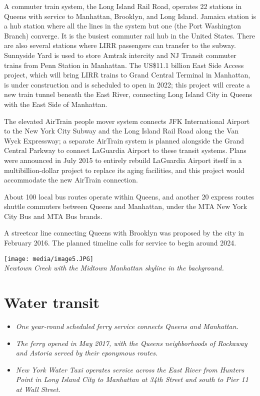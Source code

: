 A commuter train system, the Long Island Rail Road, operates 22 stations
in Queens with service to Manhattan, Brooklyn, and Long Island. Jamaica
station is a hub station where all the lines in the system but one (the
Port Washington Branch) converge. It is the busiest commuter rail hub in
the United States. There are also several stations where LIRR passengers
can transfer to the subway. Sunnyside Yard is used to store Amtrak
intercity and NJ Transit commuter trains from Penn Station in Manhattan.
The US\$11.1 billion East Side Access project, which will bring LIRR
trains to Grand Central Terminal in Manhattan, is under construction and
is scheduled to open in 2022; this project will create a new train
tunnel beneath the East River, connecting Long Island City in Queens
with the East Side of Manhattan.

The elevated AirTrain people mover system connects JFK International
Airport to the New York City Subway and the Long Island Rail Road along
the Van Wyck Expressway; a separate AirTrain system is planned alongside
the Grand Central Parkway to connect LaGuardia Airport to these transit
systems. Plans were announced in July 2015 to entirely rebuild LaGuardia
Airport itself in a multibillion-dollar project to replace its aging
facilities, and this project would accommodate the new AirTrain
connection.

About 100 local bus routes operate within Queens, and another 20 express
routes shuttle commuters between Queens and Manhattan, under the MTA New
York City Bus and MTA Bus brands.

A streetcar line connecting Queens with Brooklyn was proposed by the
city in February 2016. The planned timeline calls for service to begin
around 2024.

\texttt{[image: media/image5.JPG]}\\
\emph{Newtown Creek with the Midtown Manhattan skyline in the
background.}

\section{Water transit}\label{water-transit}

\begin{itemize}
\item
  \emph{One year-round scheduled ferry service connects Queens and
  Manhattan.}
\item
  \emph{The ferry opened in May 2017, with the Queens neighborhoods of
  Rockaway and Astoria served by their eponymous routes.}
\item
  \emph{New York Water Taxi operates service across the East River from
  Hunters Point in Long Island City to Manhattan at 34th Street and
  south to Pier 11 at Wall Street.}
\end{itemize}

